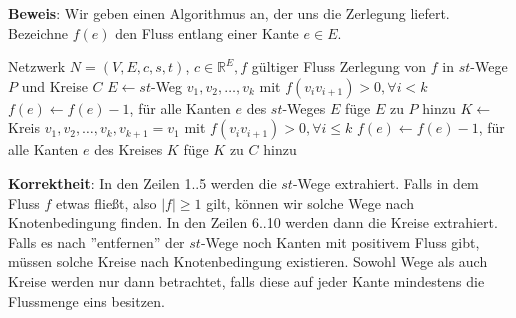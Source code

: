 \documentclass[11pt,a4paper,ngerman]{article}
\begin{document}
\textbf{Beweis}: Wir geben einen Algorithmus an, der uns die Zerlegung liefert. Bezeichne $f(e)$ den Fluss entlang einer Kante $e \in E$.

\begin{algorithmic}[1]
\Require Netzwerk $N = (V,E,c,s,t)$, $c \in \mathbb{R}^E, f$ gültiger Fluss 
\Ensure Zerlegung von $f$ in $st$-Wege $P$ und Kreise $C$
\State $E \gets st$-Weg $v_1,v_2,\ldots,v_k$ mit $f(v_iv_{i+1}) > 0, \forall i<k$
\State $f(e) \gets f(e) - 1$, für alle Kanten $e$ des $st$-Weges $E$
\State füge $E$ zu $P$ hinzu
\EndWhile
{}
\State $K \gets $ Kreis $v_1,v_2,\ldots,v_k,v_{k+1}=v_1$ mit $f(v_iv_{i+1}) > 0, \forall i \leq k$
\State $f(e) \gets f(e) - 1$, für alle Kanten $e$ des Kreises $K$
\State füge $K$ zu $C$ hinzu
\EndWhile
\end{algorithmic}

\textbf{Korrektheit}: In den Zeilen 1..5 werden die $st$-Wege extrahiert. Falls in dem Fluss $f$ etwas fließt, also $|f| \geq 1$ gilt, können wir solche Wege nach Knotenbedingung finden.
In den Zeilen 6..10 werden dann die Kreise extrahiert. Falls es nach ''entfernen'' der $st$-Wege noch Kanten mit positivem Fluss gibt, müssen solche Kreise nach Knotenbedingung existieren.
Sowohl Wege als auch Kreise werden nur dann
betrachtet, falls diese auf jeder Kante mindestens die Flussmenge eins besitzen.
\newpage
\end{document}
